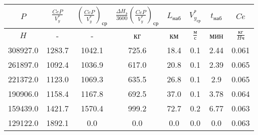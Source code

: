 \begin{tabular}{|c|c|c|c|c|c|c|c|}
\hline
$P$ & $\frac{CeP}{V_y^*}$ & $(\frac{CeP}{V_y^*})_{ср}$ & $\frac{\Delta H_э}{3600}(\frac{CeP}{V_y^*})_{ср}$ & $L_{наб}$ & $V_{y_{ср}}^*$ & $t_{наб}$ & $Ce$ \\ 
\hline
$H$ & - & - & кг & км & $\frac{м}{с}$ & мин & $\frac{кг}{H ч}$ \\ 
\hline
308927.0 & 1283.7 & 1042.1 & 725.6 & 18.4 & 0.1 & 2.44 & 0.061 \\ 
\hline
261897.0 & 1092.4 & 1036.9 & 617.0 & 20.8 & 0.1 & 2.39 & 0.065 \\ 
\hline
221372.0 & 1123.0 & 1069.3 & 635.5 & 26.8 & 0.1 & 2.9 & 0.065 \\ 
\hline
190906.0 & 1158.4 & 1167.8 & 692.5 & 37.0 & 0.1 & 3.78 & 0.064 \\ 
\hline
159439.0 & 1421.7 & 1570.4 & 999.2 & 72.7 & 0.2 & 6.77 & 0.063 \\ 
\hline
129122.0 & 1892.1 & 0.0 & 0.0 & 0.0 & 0.0 & 0.0 & 0.063 \\ 
\hline
\end{tabular}